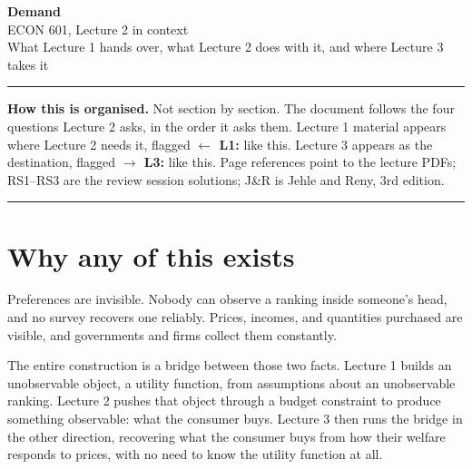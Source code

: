 \documentclass[11pt]{article}
\theoremstyle{definition}
\newcommand{\back}[1]{\textbf{\small $\leftarrow$ L1:} \small #1}
\newcommand{\fwd}[1]{\textbf{\small $\rightarrow$ L3:} \small #1}
\begin{document}
\begin{center}
{\LARGE\bfseries Demand}\\[5pt]
{\large ECON 601, Lecture 2 in context}\\[9pt]
{\small What Lecture 1 hands over, what Lecture 2 does with it, and where Lecture 3 takes it}
\end{center}

\vspace{6pt}\hrule\vspace{9pt}

{\small
\noindent\textbf{How this is organised.} Not section by section. The document follows the
four questions Lecture 2 asks, in the order it asks them. Lecture 1 material appears where
Lecture 2 needs it, flagged \back{like this}. Lecture 3 appears as the destination, flagged
\fwd{like this}. Page references point to the lecture PDFs; RS1--RS3 are the review session
solutions; J\&R is Jehle and Reny, 3rd edition.
}

\vspace{9pt}\hrule

\tableofcontents
\clearpage

\section{Why any of this exists}

Preferences are invisible. Nobody can observe a ranking inside someone's head, and no
survey recovers one reliably. Prices, incomes, and quantities purchased are visible, and
governments and firms collect them constantly.

The entire construction is a bridge between those two facts. Lecture 1 builds an
unobservable object, a utility function, from assumptions about an unobservable ranking.
Lecture 2 pushes that object through a budget constraint to produce something observable:
what the consumer buys. Lecture 3 then runs the bridge in the other direction, recovering
what the consumer buys from how their welfare responds to prices, with no need to know the
utility function at all.
\end{document}

